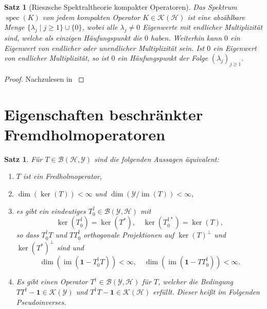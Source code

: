 \documentclass[11pt, hidelinks]{article}
\newcommand{\h}{\mathcal{H}}
\newcommand{\spec}{\operatorname{spec}}
\newcommand{\im}{\operatorname{im}}
\numberwithin{conj}{section}
\newtheorem{theorem}[conj]{Satz}
\begin{document}
\begin{theorem}[Rieszsche Spektraltheorie kompakter Operatoren]
\label{Riesz}
Das Spektrum $\spec(K)$ von jedem kompakten Operator $K \in \mathcal{K}(\h)$ ist eine abzählbare Menge $\{\lambda_j \; \vert \; j \geq 1\} \cup \{0\}$, wobei alle $\lambda_j \neq 0$ Eigenwerte mit endlicher Multiplizität sind, welche als einzigen Häufungspunkt die $0$ haben. Weiterhin kann $0$ ein Eigenwert von endlicher oder unendlicher Multiplizität sein. Ist $0$ ein Eigenwert von endlicher Multiplizität, so ist $0$ ein Häufungspunkt der Folge $(\lambda_j)_{j \geq 1}$.
\end{theorem}

\begin{proof}
Nachzulesen in \cite[VI.2.5]{werner2018funktionalanalysis}
\end{proof}

\section{Eigenschaften beschränkter Fremdholmoperatoren}

\begin{theorem}
    \label{fredholm}
    Für $T \in \mathcal{B}(\h,\mathcal{Y})$ sind die folgenden Aussagen äquivalent:
    \begin{enumerate}
        \item $T$ ist ein Fredholmoperator,
        \item $ \dim(\ker(T)) < \infty$ und $\dim(\mathcal{Y} / \im(T)) < \infty$,
        \item es gibt ein eindeutiges $T^\dagger_0 \in \mathcal{B}(\mathcal{Y},\h)$ mit
        \begin{equation}
            \ker(T^\dagger_0) = \ker(T^\ast), \quad \ker(T^{\dagger\ast}_0) = \ker(T),
        \end{equation}
        so dass $T^\dagger_0T$ und $TT^\dagger_0$ orthogonale Projektionen auf $\ker(T)^\perp$ und $\ker(T^\ast)^\perp$ sind und
        \begin{equation}
            \dim(\im(\mathbf{1}-T^\dagger_0T)) < \infty, \quad \dim(\im(\mathbf{1}-TT^\dagger_0)) < \infty.
        \end{equation}
        \item Es gibt einen Operator $T^\dagger\in \mathcal{B}(\mathcal{Y},\h)$ für $T$, welcher die Bedingung $TT^\dagger-\mathbf{1} \in \mathcal{K}(\mathcal{Y})$ und $T^\dagger T-\mathbf{1} \in \mathcal{K}(\h)$ erfüllt. Dieser heißt im Folgenden Pseudoinverses.
    \end{enumerate}
\end{theorem}
\end{document}
